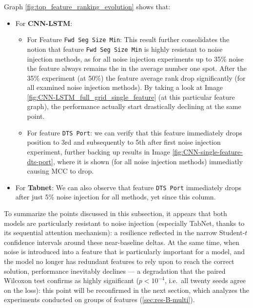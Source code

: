 \documentclass[../main.tex]{subfiles}
\begin{document}
\newpage
Graph \ref{fig:top_feature_ranking_evolution} shows that:  
\begin{itemize}
    \item For \textbf{CNN-LSTM}: 
    \begin{itemize}
        \item For Feature \texttt{Fwd Seg Size Min}: This result further consolidates the notion that feature \texttt{Fwd Seg Size Min} is highly resistant to noise injection methods, as for all noise injection experiments up to 35\% noise the feature always remains the in the average number one spot. After the 35\% experiment (at 50\%) the feature average rank drop significantly (for all examined noise injection methods). By taking a look at Image \ref{fig:CNN-LSTM_full_grid_single_feature} (at this particular feature graph), the performance actually start drastically declining at the same point. 
        \item For feature \texttt{DTS Port}: we can verify that this feature immediately drops position to 3rd and subsequently to 5th after first noise injection experiment, further backing up results in Image \ref{fig:CNN-single-feature-dts-port}, where it is shown (for all noise injection methods) immediatly causing MCC to drop. 
    \end{itemize}
    \item For \textbf{Tabnet}: We can also observe that feature \texttt{DTS Port} immediately drops after just 5\% noise injection for all methods, yet since this column.
\end{itemize}

To summarize the points discussed in this subsection, it appears that both models are particularly resistant to noise injection (especially TabNet, thanks to its sequential attention mechanism): a resilience reflected in the narrow Student-$t$ confidence intervals around these near-baseline deltas. At the same time, when noise is introduced into a feature that is particularly important for a model, and the model no longer has redundant features to rely upon to reach the correct solution, performance inevitably declines --- a degradation that the paired Wilcoxon test confirms as highly significant ($p < 10^{-4}$, i.e.\ all twenty seeds agree on the loss): this point will be reconfirmed in the next section, which analyzes the experiments conducted on groups of features (\ref{sec:res-B-multi}).
\end{document}
